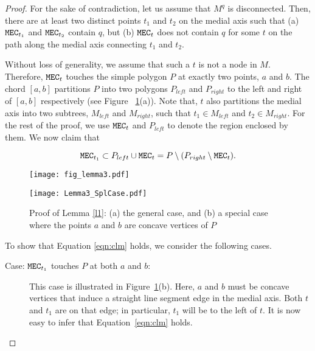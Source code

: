 \documentclass[12pt]{llncs}
\begin{document}
\begin{proof}
For the sake of contradiction, let us assume that $M^q$ is disconnected. Then, there 
are at least two distinct  points $t_1$ and $t_2$ on the medial axis such that 
(a) ${\tt MEC}_{t_1}$ and ${\tt MEC}_{t_2}$ contain $q$, but (b) ${\tt MEC}_t$ 
does not contain $q$ for some $t$  on the path along the medial axis connecting 
$t_1$ and $t_2$.   

Without loss of generality, we assume that such a $t$ is not a node in $M$. 
Therefore, ${\tt MEC}_t$ touches the simple polygon $P$ at exactly two points, 
$a$ and $b$. The chord $[a,b]$ partitions $P$ into two polygons $P_{left}$ and 
$P_{right}$ to the left and right of $[a,b]$ respectively (see Figure~
\ref{fig:fig_lemma3}(a)). 
Note that, $t$ also partitions the medial axis into two subtrees, $M_{left}$ and 
$M_{right}$, 
such that $t_1 \in M_{left}$ and $t_2 \in M_{right}$. For the rest of the proof, 
we use ${\tt MEC}_t$ and $P_{left}$ to denote the region enclosed by  
them. We now claim that 

\begin{equation}\label{eqn:clm}
{\tt MEC}_{t_1} \subset P_{left} \cup {\tt MEC}_t = P \setminus (P_{right} \setminus {\tt 
MEC}_t).
\end{equation}


\begin{figure}[ht]
\begin{minipage}[b]{0.57\linewidth}
\centering
\texttt{[image: fig\_lemma3.pdf]}
\end{minipage}
\hspace{0.5cm}
\begin{minipage}[b]{0.37\linewidth}
\centering
\texttt{[image: Lemma3\_SplCase.pdf]}
\end{minipage}
\caption{Proof of Lemma \ref{l1}: (a) the general case, and (b) a special 
case where the points $a$ and $b$ are concave vertices of $P$}
\label{fig:fig_lemma3}
\end{figure}


To show that Equation \ref{eqn:clm} holds, we consider the following cases.


\begin{description}
\item[Case: ${\tt MEC}_{t_1}$ touches $P$ at both $a$ and $b$:] 
This case is illustrated in Figure~\ref{fig:fig_lemma3}(b). Here, $a$ and $b$ 
must be concave vertices that induce a straight line segment edge in the medial 
axis. Both $t$ and $t_1$ are on that edge; in particular, $t_1$ will be to the 
left of $t$. It is now easy to infer that Equation~\ref{eqn:clm} holds.


\end{description}
\end{proof}
\end{document}
